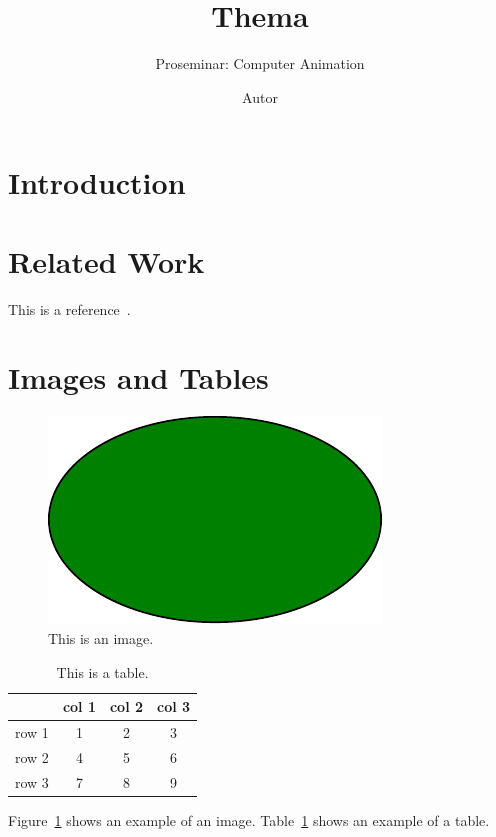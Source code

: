\documentclass[
	11pt, 
	DIV10,
	a4paper, 
	oneside, 
	headings=normal, 
	captions=tableheading,
	final, 
	numbers=noenddot
]{scrartcl}
\title{Thema}
\subtitle{\vspace{0.5cm}Proseminar: Computer Animation}
\author{Autor}
\begin{document}
\maketitle


\section{Introduction}
\lipsum[2-4]

\section{Related Work}

This is a reference~\cite{Foley:1990}.

\section{Images and Tables}

\begin{figure}[tb]
	\centering
	\includegraphics[width=0.5\linewidth]{images/image} 
	\caption{\label{fig:image} This is an image.
	}
\end{figure}

\begin{table}[tb]
	{
		\centering
		\begin{tabular}{|c|c|c|c|}
			\hline
			& col 1 & col 2 & col 3   \\
			\hline	
			row 1  & 1 & 2 & 3 \\
			row 2  & 4 & 5 & 6 \\
			row 3  & 7 & 8 & 9 \\
			\hline
		\end{tabular}
		\caption{\label{tab:example} This is a table.}
	}
\end{table}


Figure~\ref{fig:image} shows an example of an image.
Table~\ref{tab:example} shows an example of a table.




\end{document}
